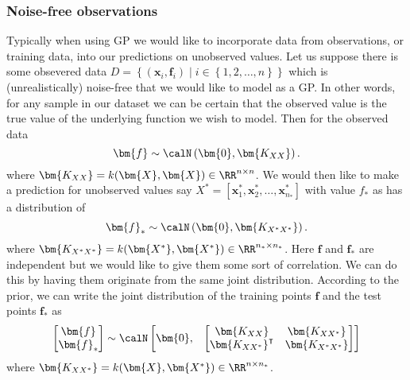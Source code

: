 \subsubsection{Noise-free observations}\label{Section1.4.1}
Typically when using GP we would like to incorporate data from observations, or training data, into our predictions on unobserved values.
Let us suppose there is some obsevered data $D = \left\{ (\bm{x}_i, \bm{f}_i) \mid i \in \left\{ 1,2, \ldots , n \right\} \right\}$ which is (unrealistically) noise-free that we would like to model as a GP. In other words, for any sample in our dataset we can be certain that the observed value is the true value of the underlying function we wish to model. Then for the observed data
\[
    \bm{f} \sim \calN \left( \bm{0}, \bm{K_{XX}} \right).
\]
where $\bm{K_{XX}} = k(\bm{X}, \bm{X}) \in \RR^{n \times n}$. We would then like to make a prediction for unobserved values say $X^{\ast} = \left[ \bm{x}_1^{\ast}, \bm{x}_2^{\ast}, \ldots , \bm{x}_{n_\ast}^{\ast} \right]$ with value $f_{\ast}$ as has a distribution of
\[
    \bm{f}_{\ast} \sim \calN \left( \bm{0}, \bm{K_{X^{\ast}X^{\ast}}} \right).
\]
where $\bm{K_{X^{\ast}X^{\ast}}} = k(\bm{X^{\ast}}, \bm{X^{\ast}}) \in \RR^{n_\ast \times n_\ast}$. Here $\bm{f}$ and $\bm{f}_{\ast}$ are independent but we would like to give them some sort of correlation. We can do this by having them originate from the same joint distribution. According to the prior, we can write the joint distribution of the training points $\bm{f}$ and the test points $\bm{f}_{\ast}$ as
\[
    \begin{bmatrix}
        \bm{f} \\
        \bm{f}_{\ast}
    \end{bmatrix}
    \sim \calN
    \begin{bmatrix}
        \bm{0}, &
        {
                \begin{bmatrix}
                    \bm{K_{XX}}                    & \bm{K_{XX^{\ast}}}        \\
                    \bm{K_{XX^{\ast}}}^{\intercal} & \bm{K_{X^{\ast}X^{\ast}}}
                \end{bmatrix}
            }
    \end{bmatrix}
\]
where $\bm{K_{XX^{\ast}}} = k(\bm{X}, \bm{X^{\ast}}) \in \RR^{n \times n_\ast}$.

